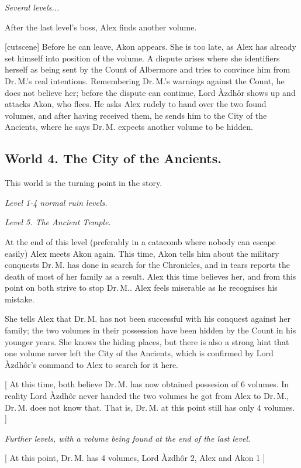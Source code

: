 \documentclass{gd-document}
\newcommand\DrM{Dr.\,M.\xspace}
\newcommand\Azdhor{Lord Àzdhôr\xspace}
\newcommand\level[1]{\textit{#1}}
\begin{document}
\level{Several levels...}

After the last level’s boss, Alex finds another volume.

[cutscene]
Before he can leave, Akon appears. She is too late, as Alex has
already set himself into position of the volume. A dispute arises
where she identifiers herself as being sent by the Count of Albermore
and tries to convince him from \DrM’s real intentions. Remembering
\DrM’s warnings against the Count, he does not believe her; before the
dispute can continue, \Azdhor shows up and attacks Akon, who flees. He
asks Alex rudely to hand over the two found volumes, and after having
received them, he sends him to the City of the Ancients, where he says
\DrM expects another volume to be hidden.

\subsection{World 4. The City of the Ancients.}

This world is the turning point in the story.

\level{Level 1-4 normal ruin levels.}

\level{Level 5. The Ancient Temple.}

At the end of this level (preferably in a catacomb where nobody can
escape easily) Alex meets Akon again. This time, Akon tells him about
the military conquests \DrM has done in search for the Chronicles, and
in tears reports the death of most of her family as a result. Alex
this time believes her, and from this point on both strive to stop
\DrM. Alex feels miserable as he recognises his mistake.

She tells Alex that \DrM has not been successful with his conquest
against her family; the two volumes in their possession have been
hidden by the Count in his younger years. She knows the hiding places,
but there is also a strong hint that one volume never left the City of
the Ancients, which is confirmed by \Azdhor’s command to Alex to
search for it here.

[ At this time, both believe \DrM has now obtained possesion of 6
volumes. In reality \Azdhor never handed the two volumes he got from
Alex to \DrM, \DrM does not know that. That is, \DrM at this point
still has only 4 volumes. ]

\level{Further levels, with a volume being found at the end of
  the last level.}

[ At this point, \DrM has 4 volumes, \Azdhor 2, Alex and Akon 1 ]
\end{document}
